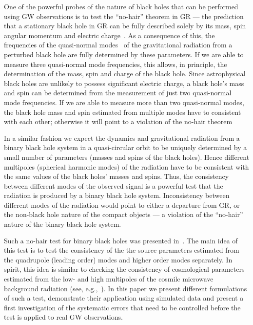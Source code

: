 \documentclass[prd,preprintnumbers,twocolumn,eqsecnum,floatfix,a4paper,nofootinbib,superscriptaddress]{revtex4}
\begin{document}
One of the powerful probes of the nature of black holes that can be performed using GW observations is to test the ``no-hair'' theorem in GR --- the prediction that a stationary black hole in GR can be fully described solely by its mass, spin angular momentum and electric charge~\cite{Israel:1967,Israel:1968,Carter:1978}. As a consequence of this, the frequencies of the {quasi-normal modes}~\cite{Vishveshwara:1970zz,Press:1971wr,Chandrasekhar:1975zza} of the gravitational radiation from a perturbed black hole are fully determined by these parameters. If we are able to measure three quasi-normal mode frequencies, this allows, in principle, the determination of the mass, spin and charge of the black hole. Since astrophysical black holes are unlikely to possess significant electric charge, a black hole's mass and spin can be determined from the measurement of just two quasi-normal mode frequencies. If we are able to measure more than two quasi-normal modes, the black hole mass and spin estimated from multiple modes have to consistent with each other; otherwise it will point to a violation of the no-hair theorem~\cite{Dreyer:2003bv}

In a similar fashion we expect the dynamics and gravitational radiation from a binary black hole system in a quasi-circular orbit to be uniquely determined by a small number of parameters (masses and spins of the black holes). Hence different multipoles (spherical harmonic modes) of the radiation have to be consistent with the same values of the black holes' masses and spins. Thus, the consistency between different modes of the observed signal is a powerful test that the radiation is produced by a binary black hole system. Inconsistency between different modes of the radiation would point to either a departure from GR, or the non-black hole nature of the compact objects --- a violation of the ``no-hair'' nature of the binary black hole system. 

Such a no-hair test for binary black holes was presented in~\cite{Dhanpal:2018ufk}. The main idea of this test is to test the consistency of the the source parameters estimated from the quadrupole (leading order) modes and higher order modes separately. In spirit, this idea is similar to checking the consistency of cosmological parameters estimated from the low- and high multipoles of the cosmilc microwave background radiation (see, e.g.,~\cite{Aghanim:2018eyx}). In this paper we present different formulations of such a test, demonstrate their application using simulated data and present a first investigation of the systematic errors that need to be controlled before the test is applied to real GW observations. 
\end{document}
